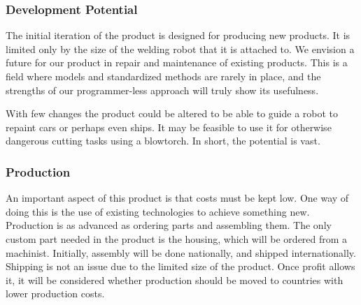 \subsubsection{Development Potential}
The initial iteration of the product is designed for producing new products. It is limited only by the size of the welding robot that it is attached to. We envision a future for our product in repair and maintenance of existing products. This is a field where models and standardized methods are rarely in place, and the strengths of our programmer-less approach will truly show its usefulness.

With few changes the product could be altered to be able to guide a robot to repaint cars or perhaps even ships. It may be feasible to use it for otherwise dangerous cutting tasks using a blowtorch. In short, the potential is vast.

\subsubsection{Production}
An important aspect of this product is that costs must be kept low. One way of doing this is the use of existing technologies to achieve something new. Production is as advanced as ordering parts and assembling them. The only custom part needed in the product is the housing, which will be ordered from a machinist. Initially, assembly will be done nationally, and shipped internationally. Shipping is not an issue due to the limited size of the product. Once profit allows it, it will be considered whether production should be moved to countries with lower production costs.
